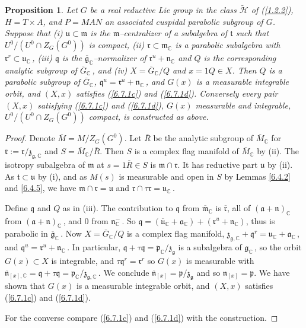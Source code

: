 \documentclass{conm-p-l}
\newtheorem{proposition}[equation]{Proposition}
\renewcommand{\gg}{\mathfrak{g}}
\newcommand{\gp}{\mathfrak{p}}
\newcommand{\gq}{\mathfrak{q}}
\def\ga{\mathfrak{a}}
\def\gg{\mathfrak{g}}
\def\gm{\mathfrak{m}}
\def\gn{\mathfrak{n}}
\def\gp{\mathfrak{p}}
\def\gq{\mathfrak{q}}
\def\gr{\mathfrak{r}}
\def\gt{\mathfrak{t}}
\def\gu{\mathfrak{u}}
\def\gz{\mathfrak{z}}
\def\C{\mathbb{C}}
\def\cH{\mathcal{H}}
\begin{document}
\begin{proposition}\label{6.7.4}
Let $G$ be a real reductive Lie group in the class $\widetilde{\cH}$
of {\rm (\ref{1.2.2})}, $H = T\times A$, and $P=MAN$ an associated cuspidal
parabolic subgroup of $G$.  Suppose that {\rm (i)} $\gu \subset \gm$ is the
$\gm$--centralizer of a subalgebra of $\gt$ such that $U^0/(U^0\cap Z_G(G^0))$
is compact, {\rm (ii)} $\gr \subset \gm_\C$ is a parabolic subalgebra with 
$\gr^r \subset \gu_\C$\,, {\rm (iii)} $\gq$ is the 
$\overline{\gg}_\C$--normalizer
of $\gr^u + \gn_\C$ and $Q$ is the corresponding analytic subgroup of
$\overline{G}_\C$\,, and {\rm (iv)} $X = \overline{G}_\C/Q$ and $x = 1Q\in X$.
Then $Q$ is a parabolic subgroup of $\overline{G}_\C$, 
$\gq^u = \gr^u + \gn_\C$\,, and $G(x)$ is a measurable integrable orbit, and 
$(X,x)$ satisfies {\rm (\ref{6.7.1c})} and {\rm (\ref{6.7.1d})}.  
Conversely every pair $(X,x)$ satisfying {\rm (\ref{6.7.1c})} and 
{\rm (\ref{6.7.1d})}, $G(x)$ measurable and integrable, $U^0/(U^0\cap Z_G(G^0))$
compact, is constructed as above.
\end{proposition}

\begin{proof}
Denote $\overline{M} = M/Z_G(G^0)$.  Let $\overline{R}$ be the analytic 
subgroup of $\overline{M}_\C$ for $\overline{\gr} := \gr/\gz_{\gg,\C}$
and $S = \overline{M}_\C/\overline{R}$.  Then $S$ is a complex flag
manifold of $\overline{M}_\C$ by (ii).  The isotropy subalgebra of $\gm$ at
$s = 1\overline{R} \in S$ is $\gm\cap \gr$.  It has reductive part $\gu$
by (ii).  As $\gt \subset \gu$ by (i), and as $M(s)$ is measurable and 
open in $S$ by Lemmas \ref{6.4.2} and \ref{6.4.5}, we have 
$\gm\cap\gr = \gu$ and $\gr\cap\tau\gr = \gu_\C$\,.

Define $\gq$ and $Q$ as in (iii).  The contribution to $\gq$ from 
$\overline{\gm}_\C$ is $\overline{\gr}$, all of $(\ga + \gn)_\C$ from
$(\ga + \gn)_\C$\,, and $0$ from $\gn_\C^-$\,.  So $\gq = 
(\overline{\gu}_\C + \ga_\C) + (\gr^u + \gn_\C)$, thus is parabolic in
$\overline{\gg}_\C$\,.  Now $X = \overline{G}_\C/Q$ is a complex flag
manifold, $\gz_{\gg,\C} + \gq^r = \gu_\C + \ga_\C$\,, and 
$\gq^u = \gr^u + \gn_\C$\,.  In particular, $\gq + \tau\gq = \gp_\C/\gz_\gg$
is a subalgebra of $\gg_\C$\,, so the orbit $G(x)\subset X$ is integrable,
and $\tau\gq^r = \gr^r$ so $G(x)$ is measurable with 
$\overline{\gn}_{[x],\C} = \gq + \tau\gq = \gp_\C/\gz_{\gg,\C}$\,.  We conclude
$\overline{\gn}_{[x]} = \gp/\gz_\gg$ and so $\gn_{[x]} = \gp$.  We have
shown that $G(x)$ is a measurable integrable orbit, and 
$(X,x)$ satisfies {\rm (\ref{6.7.1c})} and {\rm (\ref{6.7.1d})}.

For the converse compare {\rm (\ref{6.7.1c})} and {\rm (\ref{6.7.1d})}
with the construction.
\end{proof}
\end{document}
